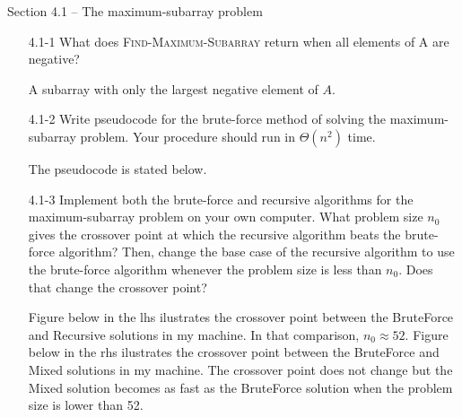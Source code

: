
{\large Section 4.1 {--} The maximum-subarray problem}

\begin{enumerate}

\item[4.1{-}1]{What does \textsc{Find-Maximum-Subarray} return when all
elements of A are negative?}

\begin{framed}
A subarray with only the largest negative element of $A$.
\end{framed}

\item[4.1{-}2]{Write pseudocode for the brute-force method of solving the
maximum-subarray problem. Your procedure should run in $\Theta(n^2)$ time.}

\begin{framed}
The pseudocode is stated below.\\
\begin{algorithm}[H]
\SetAlgoNoEnd\DontPrintSemicolon
\BlankLine
{}
\end{algorithm}
\end{framed}

\item[4.1{-}3]{Implement both the brute-force and recursive algorithms for the
maximum-subarray problem on your own computer. What problem size $n_0$ gives
the crossover point at which the recursive algorithm beats the brute-force
algorithm? Then, change the base case of the recursive algorithm to use the
brute-force algorithm whenever the problem size is less than $n_0$. Does
that change the crossover point?}



\begin{framed}
Figure below in the lhs ilustrates the crossover point between the
BruteForce and Recursive solutions in my machine. In that comparison, $n_0
\approx 52$. Figure below in the rhs ilustrates the crossover point
between the BruteForce and Mixed solutions in my machine. The crossover point
does not change but the Mixed solution becomes as fast as the BruteForce
solution when the problem size is lower than 52.


\end{framed}
\end{enumerate}
